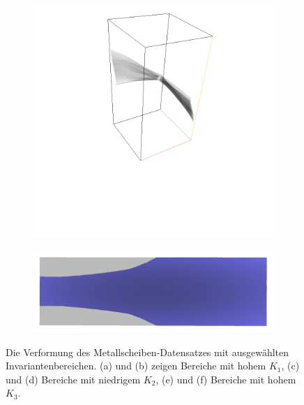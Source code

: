 \documentclass[a4paper,fontsize=12pt,toc=bib,halfparskip]{scrartcl}
\begin{document}
\begin{figure}
\begin{subfigure}{0.4\textwidth}
		\includegraphics[width=\textwidth]{pictures/results/Beam/Beam_InvariantSpace3.png}
		\subcaption{}
		\label{BeamInvariant3}
	\end{subfigure}
	\hspace*{\fill}
	\begin{subfigure}{0.4\textwidth}
		\centering
		\includegraphics[width=\textwidth]{pictures/results/Beam/Beam_Object3.png}
		\subcaption{}
		\label{BeamObject3}
	\end{subfigure}
	\caption{Die Verformung des Metallscheiben-Datensatzes mit ausgew\"ahlten Invariantenbereichen. (a) und (b) zeigen Bereiche mit hohem $K_1$, (c) und (d) Bereiche mit niedrigem $K_2$, (e) und (f) Bereiche mit hohem $K_3$.}
	\label{BeamInteraction}
\end{figure}
\end{document}
